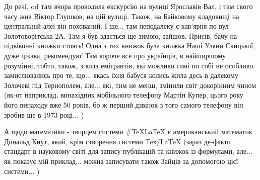 До речі, od там вчора проводила екскурсію на вулиці Ярославів Вал, і там свого
часу жив Віктор Глушков, на цій вулиці. Також, на Байковому кладовищі на
центральній алеї він похований. І ще... там неподалеку є кав'ярня по вул
Золотоворітська 2А. Там я був здається ще зимою, зайшов. Присів, бачу на
підвіконні книжки стоять! Одна з тих книжок була книжка Наші Уляни Скицької,
дуже цікава, рекомендую! Там короче все про українців, в найширшому розумінні,
тобто, також, з кола емігрантів, які можливо самі по собі не особливо
замислювались про те, що... якась їхня бабуся колись жила десь в далекому
Золочеві під Тернополем, але... які, тим не менш, змінили світ докорінним чином
(як-от наприклад, винахідник мобільного телефону Мартін Купер, цього року його
винаходу вже 50 років, бо ж перший дзвінок з того самого телефону він зробив ще
в 1973 році... )

А щодо математики - творцем системи #TeXLaTeX є американський математик Дональд
Кнут, який, крім створення системи Tex/LaTeX (зараз де-факто стандарт в
науковому світі для запису публікацій та книжок із формулами, але... як показує
мій приклад... можна записувати також Зайців за допомогою цієї системи... )
